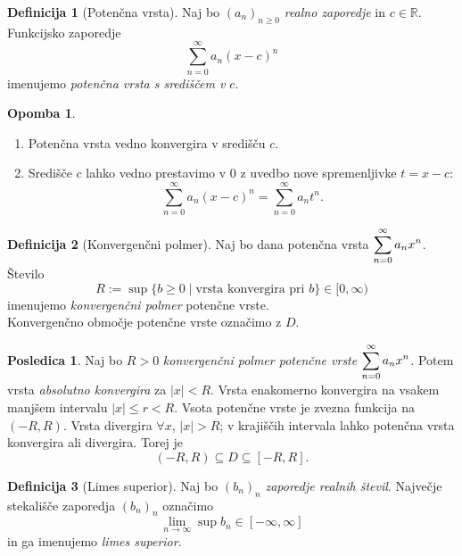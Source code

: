 \documentclass[11pt]{article}
\theoremstyle{definition}
\newtheorem{definicija}{Definicija}[section]
\theoremstyle{definition}
\theoremstyle{definition}
\theoremstyle{theorem}
\newtheorem*{posledica}{Posledica}
\newtheorem*{opomba}{Opomba}
\begin{document}
\begin{definicija}[Potenčna vrsta]

Naj bo $(a_n)_{n \geq 0}$ \textit{realno zaporedje} in $c \in \mathbb{R}$. Funkcijsko zaporedje $$\sum_{n=0}^{\infty} a_n (x - c)^n$$
imenujemo \textit{potenčna vrsta s središčem v $c$}.

\end{definicija}
\vspace{0.5cm}

\begin{opomba}
~
\begin{enumerate}
	\item Potenčna vrsta vedno konvergira v središču $c$.
	\item Središče $c$ lahko vedno prestavimo v $0$ z uvedbo nove spremenljivke $t = x - c$:
	$$\sum_{n=0}^{\infty} a_n (x-c)^n = \sum_{n=0}^{\infty} a_n t^n.$$
\end{enumerate}
\end{opomba}
\vspace{0.5cm}

\begin{definicija}[Konvergenčni polmer]

Naj bo dana potenčna vrsta $\mathlarger{\sum_{n=0}^{\infty} a_n x^n}$. Število
$$R := \sup \{b \geq 0 \mid \text{vrsta konvergira pri } b \} \in [0, \infty)$$
imenujemo \textit{konvergenčni polmer} potenčne vrste. \\
Konvergenčno območje potenčne vrste označimo z $D$.

\end{definicija}
\vspace{0.5cm}

\begin{posledica}

Naj bo $R > 0$ \textit{konvergenčni polmer potenčne vrste} $\mathlarger{\sum_{n=0}^{\infty} a_n x^n}$. Potem vrsta \textit{absolutno konvergira} za $|x| < R$. Vrsta enakomerno konvergira na vsakem manjšem intervalu $|x| \leq r < R$. Vsota potenčne vrste je zvezna funkcija na $(-R, R)$. Vrsta divergira $\forall x$, $|x| > R$; v krajiščih intervala lahko potenčna vrsta konvergira ali divergira. Torej je
$$(-R, R) \subseteq D \subseteq [-R, R].$$

\end{posledica}
\vspace{0.5cm}

\begin{definicija}[Limes superior]

Naj bo $(b_n)_n$ \textit{zaporedje realnih števil}. Največje stekališče zaporedja $(b_n)_n$ označimo 
$$\lim_{n \rightarrow \infty} \sup b_n \in [-\infty, \infty]$$
in ga imenujemo \textit{limes superior}.

\end{definicija}
\vspace{0.5cm}
\end{document}
